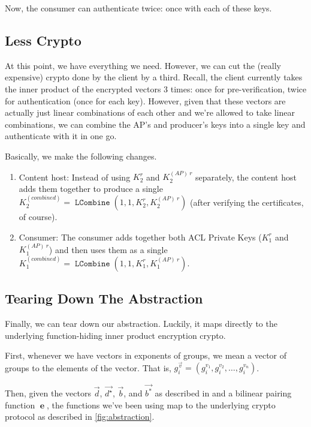 \documentclass[pdftex,12pt,a4papaer,twoside,notitlepage]{report}
\DeclareMathOperator{\e}{\mathbf{e}}
\DeclareMathOperator{\combine}{\mathtt{LCombine}}
\begin{document}
Now, the consumer can authenticate twice: once with each of these keys.

\subsection{Less Crypto}

At this point, we have everything we need. However, we can cut the (really
expensive) crypto done by the client by a third. Recall, the client currently
takes the inner product of the encrypted vectors 3 times: once for
pre-verification, twice for authentication (once for each key). However, given
that these vectors are actually just linear combinations of each other and we're
allowed to take linear combinations, we can combine the AP's and producer's keys
into a single key and authenticate with it in one go.

Basically, we make the following changes.

\begin{enumerate}
\item Content host: Instead of using $K_2^r$ and $K^{(AP)~r}_2$
  separately, the content host adds them together to produce a single
  $K_2^{(combined)} = \combine(1, 1, K_2^r, K^{(AP)~r}_2)$ (after verifying the certificates, of course).
\item Consumer: The consumer adds together both ACL Private Keys ($K_1^r$ and
  $K^{(AP)~r}_1$) and then uses them as a single $K_1^{(combined)} = \combine(1,
  1, K_1^r, K^{(AP)~r}_1)$.
\end{enumerate}

\subsection{Tearing Down The Abstraction}

Finally, we can tear down our abstraction. Luckily, it maps directly to the
underlying function-hiding inner product encryption crypto.

First, whenever we have vectors in exponents of groups, we mean a vector of
groups to the elements of the vector. That is, $g_i^{\vec{v}} = (g_i^{v_1},
g_i^{v_2}, \ldots, g_i^{v_n})$.

Then, given the vectors $\vec{d}$, $\vec{d^\star}$, $\vec{b}$, and $\vec{b^*}$
as described in \cite{signature} and a bilinear pairing function $\e$, the
functions we've been using map to the underlying crypto protocol as described in
\cref{fig:abstraction}.
\end{document}
